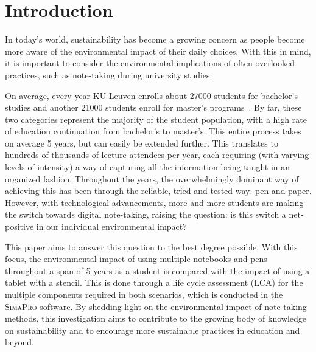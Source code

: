 \section{Introduction}\label{sec:introduction}

In today's world, sustainability has become a growing concern as people become more aware of the environmental impact of their daily choices. With this in mind, it is important to consider the environmental implications of often overlooked practices, such as note-taking during university studies.

On average, every year KU Leuven enrolls about 27000 students for bachelor's studies and another 21000 students enroll for master's programs~\cite{KULstatistics}. By far, these two categories represent the majority of the student population, with a high rate of education continuation from bachelor's to master's. This entire process takes on average 5 years, but can easily be extended further. This translates to hundreds of thousands of lecture attendees per year, each requiring (with varying levels of intensity) a way of capturing all the information being taught in an organized fashion. Throughout the years, the overwhelmingly dominant way of achieving this has been through the reliable, tried-and-tested way: pen and paper. However, with technological advancements, more and more students are making the switch towards digital note-taking, raising the question: is this switch a net-positive in our individual environmental impact?

This paper aims to answer this question to the best degree possible. With this focus, the environmental impact of using multiple notebooks and pens throughout a span of 5 years as a student is compared with the impact of using a tablet with a stencil. This is done through a life cycle assessment (LCA) for the multiple components required in both scenarios, which is conducted in the \textsc{SimaPro} software. By shedding light on the environmental impact of note-taking methods, this investigation aims to contribute to the growing body of knowledge on sustainability and to encourage more sustainable practices in education and beyond.
